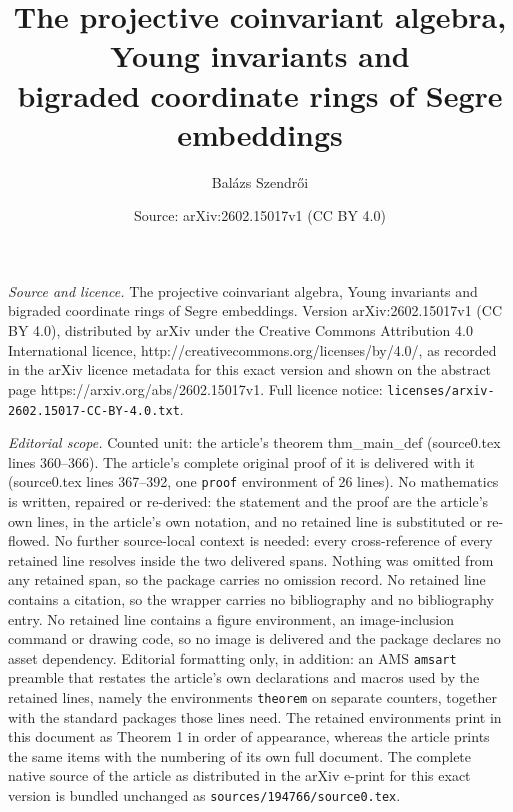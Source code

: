 \documentclass[10pt,a4paper]{amsart}
\title{The projective coinvariant algebra, Young invariants and \\ bigraded coordinate rings of Segre embeddings}
\author{Bal\'azs Szendr\H{o}i}
\date{Source: arXiv:2602.15017v1 (CC BY 4.0)}
\begin{document}
\maketitle

\noindent\emph{Source and licence.} The projective coinvariant algebra, Young invariants and \\ bigraded coordinate rings of Segre embeddings. Version arXiv:2602.15017v1 (CC BY 4.0), distributed by arXiv under the Creative Commons Attribution 4.0 International licence, http://creativecommons.org/licenses/by/4.0/, as recorded in the arXiv licence metadata for this exact version and shown on the abstract page https://arxiv.org/abs/2602.15017v1. Full licence notice: \texttt{licenses/arxiv-2602.15017-CC-BY-4.0.txt}.\par\smallskip

\noindent\textit{Editorial scope.} Counted unit: the article's theorem thm\_main\_def (source0.tex lines 360--366). The article's complete original proof of it is delivered with it (source0.tex lines 367--392, one \texttt{proof} environment of 26 lines). No mathematics is written, repaired or re-derived: the statement and the proof are the article's own lines, in the article's own notation, and no retained line is substituted or re-flowed.  No further source-local context is needed: every cross-reference of every retained line resolves inside the two delivered spans.  Nothing was omitted from any retained span, so the package carries no omission record.  No retained line contains a citation, so the wrapper carries no bibliography and no bibliography entry.  No retained line contains a figure environment, an image-inclusion command or drawing code, so no image is delivered and the package declares no asset dependency.  Editorial formatting only, in addition: an AMS \texttt{amsart} preamble that restates the article's own declarations and macros used by the retained lines, namely the environments \texttt{theorem} on separate counters, together with the standard packages those lines need.  The retained environments print in this document as Theorem 1 in order of appearance, whereas the article prints the same items with the numbering of its own full document.  The complete native source of the article as distributed in the arXiv e-print for this exact version is bundled unchanged as \texttt{sources/194766/source0.tex}.
\end{document}
